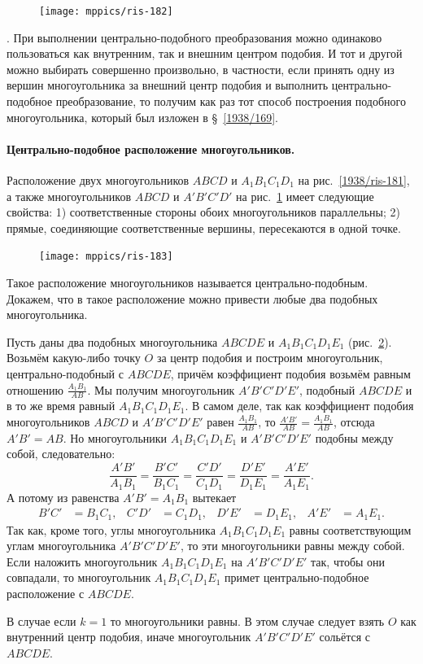 \documentclass[twoside]{book}
\begin{document}
\begin{figure}[h]
\centering
\texttt{[image: mppics/ris-182]}
\caption{}\label{1938/ris-182}
\end{figure}

\smallskip
{}.
При выполнении центрально-подобного преобразования можно одинаково пользоваться как внутренним, так и внешним центром подобия.
И тот и другой можно выбирать совершенно произвольно, в частности, если принять одну из вершин многоугольника за внешний центр подобия и выполнить центрально-подобное преобразование, то получим как раз тот способ построения подобного многоугольника, который был изложен в §~\ref{1938/169}.

\paragraph{Центрально-подобное расположение многоугольников.}\label{1938/176}
Расположение двух многоугольников $ABCD$ и $A_1B_1C_1D_1$ на рис.~\ref{1938/ris-181}, а также многоугольников $ABCD$ и $A'B'C'D'$ на рис.~\ref{1938/ris-182} имеет следующие свойства:
1) соответственные стороны обоих многоугольников параллельны;
2) прямые, соединяющие соответственные вершины, пересекаются в одной точке.

\begin{figure}[h]
\centering
\texttt{[image: mppics/ris-183]}
\caption{}\label{1938/ris-183}
\end{figure}

{\sloppy

Такое расположение многоугольников называется центрально-подобным. 
Докажем, что в такое расположение можно привести любые два подобных многоугольника.

Пусть даны два подобных многоугольника $ABCDE$ и $A_1B_1C_1D_1E_1$ (рис.~\ref{1938/ris-183}).
Возьмём какую-либо точку $O$ за центр подобия и построим многоугольник, центрально-подобный  с $ABCDE$, причём коэффициент подобия возьмём равным отношению $\frac{A_1B_1}{AB}$.
Мы получим многоугольник $A'B'C'D'E'$, подобный $ABCDE$ и в то же время равный $A_1B_1C_1D_1E_1$.
В самом деле, так как коэффициент подобия многоугольников $ABCD$ и $A'B'C'D'E'$ равен $\frac{A_1B_1}{AB}$, то $\frac{A'B'}{AB}=\frac{A_1B_1}{AB}$, отсюда $A'B'=AB$.
Но многоугольники $A_1B_1C_1D_1E_1$ и $A'B'C'D'E'$ подобны между собой, следовательно:
\[\frac{A'B'}{A_1B_1}=\frac{B'C'}{B_1C_1}=\frac{C'D'}{C_1D_1}=\frac{D'E'}{D_1E_1}=\frac{A'E'}{A_1E_1}.\]
А потому из равенства $A'B'=A_1B_1$ вытекает 
\begin{align*}
B'C'&=B_1C_1,&
C'D'&=C_1D_1,&
D'E'&=D_1E_1,&
A'E'&=A_1E_1.
\end{align*}
Так как, кроме того, углы многоугольника $A_1B_1C_1D_1E_1$ равны соответствующим углам многоугольника $A'B'C'D'E'$, то эти многоугольники равны между собой. 
Если наложить многоугольник $A_1B_1C_1D_1E_1$ на  $A'B'C'D'E'$ так, чтобы они совпадали, то многоугольник $A_1B_1C_1D_1E_1$ примет центрально-подобное расположение с $ABCDE$. 

В случае если $k=1$ то многоугольники равны.
В этом случае следует взять $O$ как внутренний центр подобия, иначе многоугольник $A'B'C'D'E'$ сольётся с $ABCDE$.


}
\end{document}
